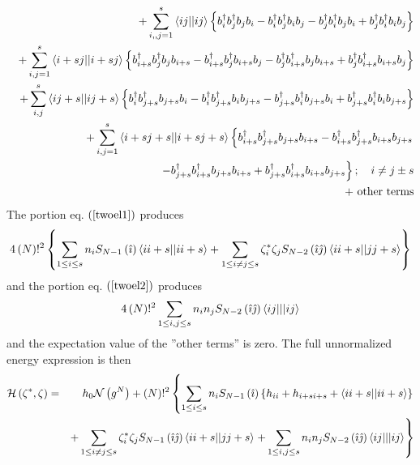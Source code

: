 \documentclass{article}
\begin{document}
\begin{eqnarray}
&&+\sum_{i,,j=1}^{s}\left\langle ij||ij\right\rangle \left\{ b_{i}^{\dagger
}b_{j}^{\dagger }b_{j}b_{i}-b_{i}^{\dagger }b_{j}^{\dagger
}b_{i}b_{j}-b_{j}^{\dagger }b_{i}^{\dagger }b_{j}b_{i}+b_{j}^{\dagger
}b_{i}^{\dagger }b_{i}b_{j}\right\}  \notag \\
&&+\sum_{i,j=1}^{s}\left\langle i+sj||i+sj\right\rangle \left\{
b_{i+s}^{\dagger }b_{j}^{\dagger }b_{j}b_{i+s}-b_{i+s}^{\dagger
}b_{j}^{\dagger }b_{i+s}b_{j}-b_{j}^{\dagger }b_{i+s}^{\dagger
}b_{j}b_{i+s}+b_{j}^{\dagger }b_{i+s}^{\dagger }b_{i+s}b_{j}\right\}  \notag
\\
&&+\sum_{i,j}^{s}\left\langle ij+s||ij+s\right\rangle \left\{ b_{i}^{\dagger
}b_{j+s}^{\dagger }b_{j+s}b_{i}-b_{i}^{\dagger }b_{j+s}^{\dagger
}b_{i}b_{j+s}-b_{j+s}^{\dagger }b_{i}^{\dagger
}b_{j+s}b_{i}+b_{j+s}^{\dagger }b_{i}^{\dagger }b_{i}b_{j+s}\right\}  \notag
\\
&&+\sum_{i,j=1}^{s}\left\langle i+sj+s||i+sj+s\right\rangle \left\{
b_{i+s}^{\dagger }b_{j+s}^{\dagger }b_{j+s}b_{i+s}-b_{i+s}^{\dagger
}b_{j+s}^{\dagger }b_{i+s}b_{j+s}\right.  \notag \\
&&\qquad \qquad \qquad \qquad \qquad \qquad \left. -b_{j+s}^{\dagger
}b_{i+s}^{\dagger }b_{j+s}b_{i+s}+b_{j+s}^{\dagger }b_{i+s}^{\dagger
}b_{i+s}b_{j+s}\right\} ;\quad i\neq j\pm s  \notag \\
&&+\text{ other terms}  \label{twoel2}
\end{eqnarray}%
The portion eq. $\left( \ref{twoel1}\right) $ produces 
\begin{equation}
4\left( N\right) !^{2}\left\{ \sum_{1\leq i\leq s}n_{i}S_{N-1}\left( \hat{%
\imath}\right) \left\langle ii+s||ii+s\right\rangle +\sum_{1\leq i\neq j\leq
s}\zeta _{i}^{\ast }\zeta _{j}S_{N-2}\left( \hat{\imath}\hat{\jmath}\right)
\left\langle ii+s||jj+s\right\rangle \right\}
\end{equation}%
and the portion eq. $\left( \ref{twoel2}\right) $ produces%
\begin{equation}
4\left( N\right) !^{2}\sum_{1\leq i,j\leq s}n_{i}n_{j}S_{N-2}\left( \hat{%
\imath}\hat{\jmath}\right) \left\langle ij|||ij\right\rangle
\end{equation}%
and the expectation value of the ''other terms'' is zero. The full
unnormalized energy expression is then 
\begin{eqnarray}
\mathcal{H}\left( \mathbf{\zeta }^{\ast },\mathbf{\zeta }\right) &=&h_{0}%
\mathcal{N}\left( g^{N}\right) +\left( N\right) !^{2}\left\{ \sum_{1\leq
i\leq s}n_{i}S_{N-1}\left( \hat{\imath}\right) \left\{
h_{ii}+h_{i+si+s}+\left\langle ii+s||ii+s\right\rangle \right\} \right. 
\notag \\
&&+\sum_{1\leq i\neq j\leq s}\zeta _{i}^{\ast }\zeta _{j}S_{N-1}\left( \hat{%
\imath}\hat{\jmath}\right) \left\langle ii+s||jj+s\right\rangle \left.
+\sum_{1\leq i,j\leq s}n_{i}n_{j}S_{N-2}\left( \hat{\imath}\hat{\jmath}%
\right) \left\langle ij|||ij\right\rangle \right\}
\end{eqnarray}
\end{document}
